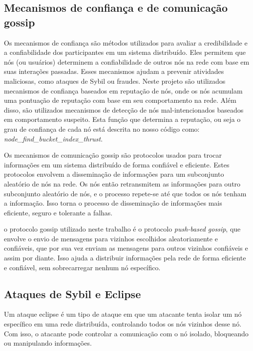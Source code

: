 \documentclass[conference]{IEEEtran}
\begin{document}




    \subsection{Mecanismos de confiança e de comunicação gossip}
    Os mecanismos de confiança são métodos utilizados para avaliar a credibilidade e a confiabilidade dos participantes em um sistema distribuído. Eles permitem que nós (ou usuários) determinem a confiabilidade de outros nós na rede com base em suas interações passadas. Esses mecanismos ajudam a prevenir atividades maliciosas, como ataques de Sybil ou fraudes.
    Neste projeto são utilizados mecanismos de confiança baseados em reputação de nós, onde os nós acumulam uma pontuação de reputação com base em seu comportamento na rede. Além disso, são utilizados mecanismos de detecção de nós mal-intencionados baseados em comportamento suspeito. Esta função que determina a reputação, ou seja o grau de confiança de cada nó está descrita no nosso código como: \textit{node\_find\_bucket\_index\_thrust}.

    Os mecanismos de comunicação gossip são protocolos usados para trocar informações em um sistema distribuído de forma confiável e eficiente. Estes protocolos envolvem a disseminação de informações para um subconjunto aleatório de nós na rede. Os nós então retransmitem as informações para outro subconjunto aleatório de nós, e o processo repete-se até que todos os nós tenham a informação. Isso torna o processo de disseminação de informações mais eficiente, seguro e tolerante a falhas.

    o protocolo gossip utilizado neste trabalho é o protocolo \textit{push-based gossip}, que envolve o envio de mensagens para vizinhos escolhidos aleatoriamente e confiáveis, que por sua vez enviam as mensagens para outros vizinhos confiáveis e assim por diante. Isso ajuda a distribuir informações pela rede de forma eficiente e confiável, sem sobrecarregar nenhum nó específico.

    \subsection{Ataques de Sybil e Eclipse}

    Um ataque eclipse é um tipo de ataque em que um atacante tenta isolar um nó específico em uma rede distribuída, controlando todos os nós vizinhos desse nó. Com isso, o atacante pode controlar a comunicação com o nó isolado, bloqueando ou manipulando informações.
\end{document}
